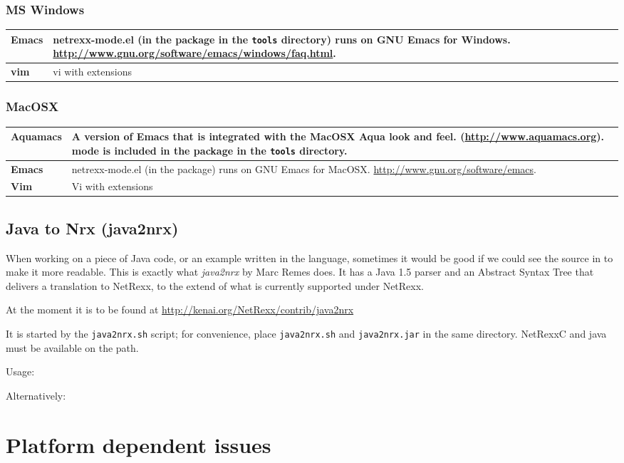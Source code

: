\subsection{MS Windows}
\begin{tabularx}{\textwidth}{>{\bfseries}lX}
\toprule
Emacs & netrexx-mode.el (in the \nr{} package in the \texttt{tools} directory) runs on GNU Emacs for
Windows. \url{http://www.gnu.org/software/emacs/windows/faq.html}.
\\\midrule
vim & vi with extensions
\\\bottomrule
\end{tabularx}
\subsection{MacOSX}
\begin{tabularx}{\textwidth}{>{\bfseries}lX}
\toprule
Aquamacs & A version of Emacs that is integrated with the MacOSX Aqua
look and feel. (\url{http://www.aquamacs.org}). \nr{} mode is
included in the \nr{} package in the \texttt{tools} directory.
\\\midrule
Emacs & netrexx-mode.el (in the \nr{} package) runs on GNU Emacs for
MacOSX. \url{http://www.gnu.org/software/emacs}.
\\\midrule
Vim & Vi with extensions
\\\bottomrule
\end{tabularx}
\section{Java to Nrx (java2nrx)}
When working on a piece of Java code, or an example written in the
language, sometimes it would be good if we could see the source in
\nr{}to make it more readable. This is exactly what \emph{java2nrx}
by Marc Remes does. It has a  Java 1.5 parser and an Abstract Syntax
Tree that delivers a translation to NetRexx, to the
extend of what is currently supported under NetRexx.

At the moment it is to be found at \url{http://kenai.org/NetRexx/contrib/java2nrx}

It is started by the \texttt{java2nrx.sh} script; for convenience, place \texttt{java2nrx.sh} and \texttt{java2nrx.jar} in the
same directory. NetRexxC and java must be available on the path.

Usage:

Alternatively:


\chapter{Platform dependent issues}
